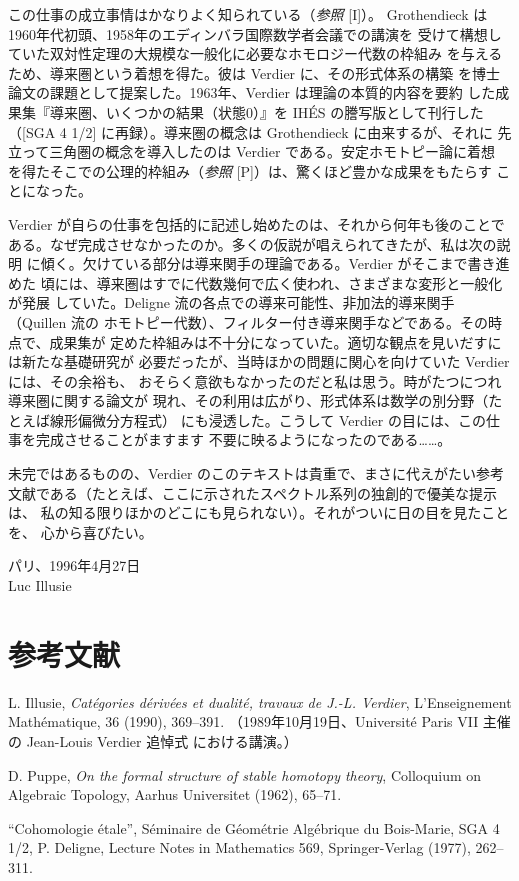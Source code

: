 この仕事の成立事情はかなりよく知られている（\emph{参照} [I]）。
Grothendieck は1960年代初頭、1958年のエディンバラ国際数学者会議での講演を
受けて構想していた双対性定理の大規模な一般化に必要なホモロジー代数の枠組み
を与えるため、導来圏という着想を得た。彼は Verdier に、その形式体系の構築
を博士論文の課題として提案した。1963年、Verdier は理論の本質的内容を要約
した成果集『導来圏、いくつかの結果（状態0）』を IHÉS の謄写版として刊行した
（[SGA 4 1/2] に再録）。導来圏の概念は Grothendieck に由来するが、それに
先立って三角圏の概念を導入したのは Verdier である。安定ホモトピー論に着想
を得たそこでの公理的枠組み（\emph{参照} [P]）は、驚くほど豊かな成果をもたらす
ことになった。

Verdier が自らの仕事を包括的に記述し始めたのは、それから何年も後のことで
ある。なぜ完成させなかったのか。多くの仮説が唱えられてきたが、私は次の説明
に傾く。欠けている部分は導来関手の理論である。Verdier がそこまで書き進めた
頃には、導来圏はすでに代数幾何で広く使われ、さまざまな変形と一般化が発展
していた。Deligne 流の各点での導来可能性、非加法的導来関手（Quillen 流の
ホモトピー代数）、フィルター付き導来関手などである。その時点で、成果集が
定めた枠組みは不十分になっていた。適切な観点を見いだすには新たな基礎研究が
必要だったが、当時ほかの問題に関心を向けていた Verdier には、その余裕も、
おそらく意欲もなかったのだと私は思う。時がたつにつれ導来圏に関する論文が
現れ、その利用は広がり、形式体系は数学の別分野（たとえば線形偏微分方程式）
にも浸透した。こうして Verdier の目には、この仕事を完成させることがますます
不要に映るようになったのである……。

\clearpage
{}
未完ではあるものの、Verdier のこのテキストは貴重で、まさに代えがたい参考
文献である（たとえば、ここに示されたスペクトル系列の独創的で優美な提示は、
私の知る限りほかのどこにも見られない）。それがついに日の目を見たことを、
心から喜びたい。

\begin{flushright}
パリ、1996年4月27日\\
Luc Illusie
\end{flushright}

\section*{参考文献}

\begin{description}[labelwidth=6.2em,leftmargin=6.8em]
\item[{[I]}] L. Illusie, \emph{Catégories dérivées et dualité, travaux de
J.-L. Verdier}, L'Enseignement Mathématique, 36 (1990), 369--391.
（1989年10月19日、Université Paris VII 主催の Jean-Louis Verdier 追悼式
における講演。）

\item[{[P]}] D. Puppe, \emph{On the formal structure of stable homotopy
theory}, Colloquium on Algebraic Topology, Aarhus Universitet (1962),
65--71.

\item[{\mbox{[SGA 4 1/2]}}] ``Cohomologie étale'', Séminaire de Géométrie
Algébrique du Bois-Marie, SGA 4 1/2, P. Deligne, Lecture Notes in
Mathematics 569, Springer-Verlag (1977), 262--311.
\end{description}
